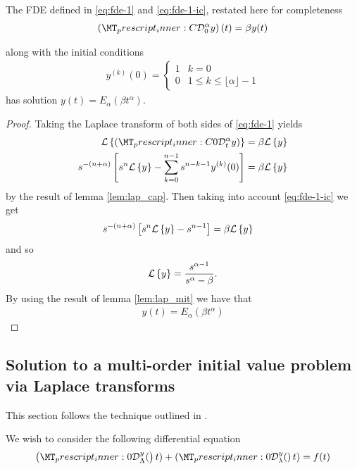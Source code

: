 \begin{lemma}
	The FDE defined in \eqref{eq:fde-1} and \eqref{eq:fde-1-ic}, restated here for completeness 
	\begin{align*}
		\left( \prescript{C}{}{\mathcal{D}_0^\alpha}y \right)(t) = \beta y(t) 
	\end{align*}

	along with the initial conditions 
	\begin{align*}
		y^{(k)}(0) = 
		\begin{cases}
			1 & k = 0 \\
			0 & 1 \leq k \leq \lfloor \alpha \rfloor - 1  
		\end{cases}
	\end{align*}
	has solution $ y(t) = E_\alpha \left( \beta t^\alpha \right) $.
\end{lemma}
\begin{proof}
	Taking the Laplace transform of both sides of \eqref{eq:fde-1} yields
	\begin{align*}
		\laplace{\capder{0}{t}{\alpha}{y}} &= \beta \laplace{y} \\
		s^{-(n+\alpha)} \left[s^n \laplace{y} - \sum_{k=0}^{n-1} s^{n-k-1} y^{(k)}(0) \right] &= \beta \laplace{y}
	\end{align*}
	by the result of lemma \ref{lem:lap_cap}. 
	Then taking into account \eqref{eq:fde-1-ic} we get
	\begin{align*}
		s^{-(n+\alpha)} \left[s^n \mathcal{L} \left\{ y \right\} - s^{n-1}\right] &= \beta \mathcal{L} \left\{ y \right\}
	\end{align*}
	and so 
	\begin{align*}
		\mathcal{L} \left\{ y \right\} = \frac{s^{\alpha-1}}{s^\alpha - \beta}.
	\end{align*}
	By using the result of lemma \ref{lem:lap_mit} we have that 
	\begin{align*}
		y(t) = E_\alpha(\beta t^\alpha)
	\end{align*}
\end{proof}

\subsection{Solution to a multi-order initial value problem via Laplace transforms}
This section follows the technique outlined in \cite{Podlubny1999}.

We wish to consider the following differential equation
\begin{align}
	\label{eq:fde-multi-order}
	\rld{0}{\Lambda}{y}(t) + \rld{0}{\lambda}{y}(t) = f(t)
\end{align}

